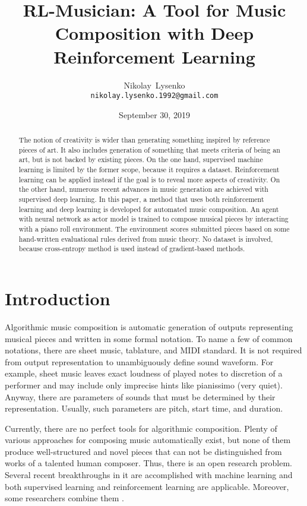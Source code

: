 \documentclass{article}
\title{RL-Musician: A Tool for Music Composition with Deep Reinforcement Learning}
\date{September 30, 2019}
\author{
  Nikolay~Lysenko\\
  \texttt{nikolay.lysenko.1992@gmail.com} \\
}
\begin{document}
\maketitle

\begin{abstract}
The notion of creativity is wider than generating something inspired by reference pieces of art. It also includes generation of something that meets criteria of being an art, but is not backed by existing pieces. On the one hand, supervised machine learning is limited by the former scope, because it requires a dataset. Reinforcement learning can be applied instead if the goal is to reveal more aspects of creativity. On the other hand, numerous recent advances in music generation are achieved with supervised deep learning. In this paper, a method that uses both reinforcement learning and deep learning is developed for automated music composition. An agent with neural network as actor model is trained to compose musical pieces by interacting with a piano roll environment. The environment scores submitted pieces based on some hand-written evaluational rules derived from music theory. No dataset is involved, because cross-entropy method is used instead of gradient-based methods.
\end{abstract}



\section{Introduction}
\label{sec:introduction}

Algorithmic music composition is automatic generation of outputs representing musical pieces and written in some formal notation. To name a few of common notations, there are sheet music, tablature, and MIDI standard. It is not required from output representation to unambiguously define sound waveform. For example, sheet music leaves exact loudness of played notes to discretion of a performer and may include only imprecise hints like pianissimo (very quiet). Anyway, there are parameters of sounds that must be determined by their representation. Usually, such parameters are pitch, start time, and duration.

Currently, there are no perfect tools for algorithmic composition. Plenty of various approaches for composing music automatically exist, but none of them produce well-structured and novel pieces that can not be distinguished from works of a talented human composer. Thus, there is an open research problem. Several recent breakthroughs in it are accomplished with machine learning and both supervised learning \cite{johnson2017generating, payne2019musenet} and reinforcement learning \cite{smith2012reinforcement} are applicable. Moreover, some researchers combine them \cite{jaques2016generating, kotecha2018bach, kumar2019polyphonic}.
\end{document}
